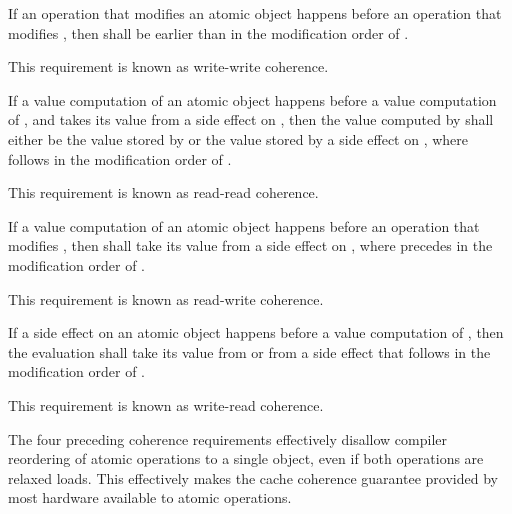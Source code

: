 \pnum
{}%
If an operation  that modifies an atomic object  happens before
an operation  that modifies , then  shall be earlier
than  in the modification order of . \begin{note} This requirement
is known as write-write coherence. \end{note}

\pnum
{}%
If a
%
value computation  of an atomic object  happens before a
value computation  of , and  takes its value from a side
effect  on , then the value computed by  shall either be
the value stored by  or the value stored by a
%
side effect  on
, where  follows  in the modification order of .
\begin{note} This requirement is known as read-read coherence. \end{note}

\pnum
{}%
If a
%
value computation  of an atomic object  happens before an
operation  that modifies , then  shall take its value from a side
effect  on , where  precedes  in the
modification order of . \begin{note} This requirement is known as
read-write coherence. \end{note}

\pnum
{}%
If a
%
side effect  on an atomic object  happens before a value
computation  of , then the evaluation  shall take its
value from  or from a
%
side effect  that follows  in the
modification order of . \begin{note} This requirement is known as
write-read coherence. \end{note}

\pnum
\begin{note} The four preceding coherence requirements effectively disallow
compiler reordering of atomic operations to a single object, even if both
operations are relaxed loads. This effectively makes the cache coherence
guarantee provided by most hardware available to \Cpp atomic operations.
\end{note}

